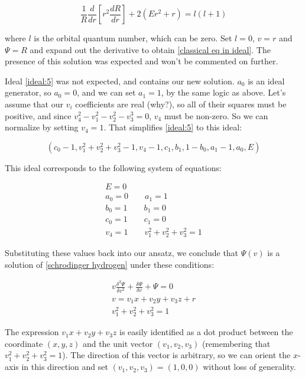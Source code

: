 \documentclass{article}
\begin{document}
\begin{equation}
\frac{1}{R} \frac{d}{dr}\left[ r^2 \frac{dR}{dr}\right] + 2(Er^2 + r) = l(l+1)
\end{equation}

where $l$ is the orbital quantum number, which can be zero.  Set $l=0$, $v=r$ and $\Psi=R$ and
expand out the derivative to obtain \eqref{classical eq in ideal}.  The presence of this solution was
expected and won't be commented on further.

Ideal \eqref{ideal:5} was not expected, and contains our new solution.
$a_0$ is an ideal generator,
so $a_0=0$, and we can set $a_1=1$, by the same logic as above.
Let's assume that our $v_i$ coefficients are real (why?), so all of their squares must
be positive, and since $v_4^2-v_1^2-v_2^2-v_3^3=0$, $v_4$ must be non-zero.  So we can normalize by setting $v_4=1$.
That simplifies \eqref{ideal:5} to this ideal:

\begin{equation}
\left(c_{0} - 1, v_{1}^{2} + v_{2}^{2} + v_{3}^{2} - 1, v_4 - 1, c_{1}, b_{1}, 1 - b_{0}, a_1 - 1, a_{0}, E\right)
\end{equation}

This ideal corresponds to the following system of equations:

\begin{equation}
\begin{gathered}
E = 0 \\
a_0 = 0 \qquad
a_1 = 1 \\
b_0 = 1 \qquad
b_1 = 0 \\
c_0 = 1 \qquad
c_1 = 0 \\
v_4 = 1 \qquad
v_1^2 + v_2^2 + v_3^2 = 1
\end{gathered}
\end{equation}

Substituting these values back into our ansatz, we conclude that $\Psi(v)$
is a solution of \eqref{schrodinger hydrogen} under these conditions:

\begin{equation}
\label{related solution}
\begin{gathered}
v \frac{\delta^2\Psi}{\delta v^2} + \frac{\delta\Psi}{\delta v} + \Psi = 0 \\
v = v_1 x+ v_2 y+ v_3 z+r \\
v_1^2 + v_2^2 + v_3^2 = 1
\end{gathered}
\end{equation}

The expression $v_1 x + v_2 y + v_3 z$ is easily identified as a dot product between
the coordinate $(x,y,z)$ and the unit vector $(v_1, v_2, v_3)$ (remembering
that $v_1^2 + v_2^2 + v_3^2 = 1$).  The direction of this vector is arbitrary,
so we can orient the $x$-axis in this direction and set $(v_1, v_2, v_3) = (1,0,0)$
without loss of generality.
\end{document}
